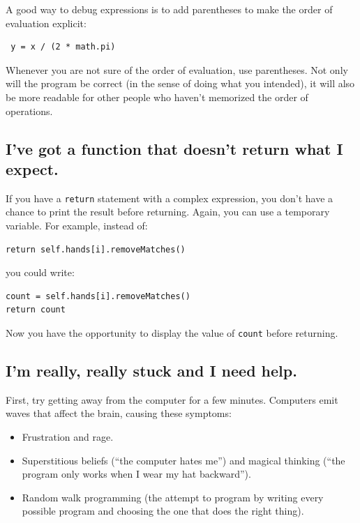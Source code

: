 \documentclass[10pt]{book}
\begin{document}
A good way to debug expressions is to add parentheses to make
the order of evaluation explicit:

\begin{verbatim}
 y = x / (2 * math.pi)
\end{verbatim}
%
Whenever you are not sure of the order of evaluation, use
parentheses.  Not only will the program be correct (in the sense
of doing what you intended), it will also be more readable for
other people who haven't memorized the order of operations.


\subsection{I've got a function that doesn't return what I
expect.}

If you have a {\tt return} statement with a complex expression,
you don't have a chance to print the result before
returning.  Again, you can use a temporary variable.  For
example, instead of:

\begin{verbatim}
return self.hands[i].removeMatches()
\end{verbatim}
%
you could write:

\begin{verbatim}
count = self.hands[i].removeMatches()
return count
\end{verbatim}
%
Now you have the opportunity to display the value of
{\tt count} before returning.


\subsection{I'm really, really stuck and I need help.}

First, try getting away from the computer for a few minutes.
Computers emit waves that affect the brain, causing these
symptoms:

\begin{itemize}

\item Frustration and rage.

\item Superstitious beliefs (``the computer hates me'') and
magical thinking (``the program only works when I wear my
hat backward'').

\item Random walk programming (the attempt to program by writing
every possible program and choosing the one that does the right
thing).

\end{itemize}
\end{document}
